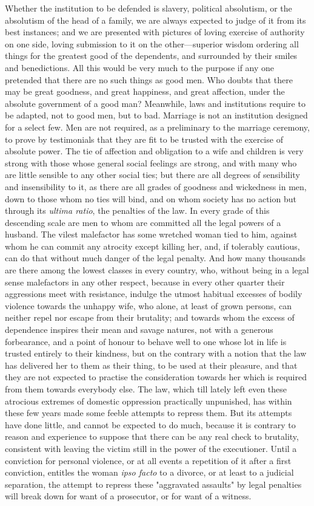 \documentclass[12pt]{report}
\begin{document}
Whether the institution to be defended is slavery, political absolutism, or the absolutism of the head of a family, we are always expected to judge of it from its best instances; and we are presented with pictures of loving exercise of authority on one side, loving submission to it on the other—superior wisdom ordering all things for the greatest good of the dependents, and surrounded by their smiles and benedictions. All this would be very much to the purpose if any one pretended that there are no such things as good men. Who doubts that there may be great goodness, and great happiness, and great affection, under the absolute government of a good man? Meanwhile, laws and institutions require to be adapted, not to good men, but to bad. Marriage is not an institution designed for a select few. Men are not required, as a preliminary to the marriage ceremony, to prove by testimonials that they are fit to be trusted with the exercise of absolute power. The tie of affection and obligation to a wife and children is very strong with those whose general social feelings are strong, and with many who are little sensible to any other social ties; but there are all degrees of sensibility and insensibility to it, as there are all grades of goodness and wickedness in men, down to those whom no ties will bind, and on whom society has no action but through its \emph{ultima ratio}, the penalties of the law. In every grade of this descending scale are men to whom are committed all the legal powers of a husband. The vilest malefactor has some wretched woman tied to him, against whom he can commit any atrocity except killing her, and, if tolerably cautious, can do that without much danger of the legal penalty. And how many thousands are there among the lowest classes in every country, who, without being in a legal sense malefactors in any other respect, because in every other quarter their aggressions meet with resistance, indulge the utmost habitual excesses of bodily violence towards the unhappy wife, who alone, at least of grown persons, can neither repel nor escape from their brutality; and towards whom the excess of dependence inspires their mean and savage natures, not with a generous forbearance, and a point of honour to behave well to one whose lot in life is trusted entirely to their kindness, but on the contrary with a notion that the law has delivered her to them as their thing, to be used at their pleasure, and that they are not expected to practise the consideration towards her which is required from them towards everybody else. The law, which till lately left even these atrocious extremes of domestic oppression practically unpunished, has within these few years made some feeble attempts to repress them. But its attempts have done little, and cannot be expected to do much, because it is contrary to reason and experience to suppose that there can be any real check to brutality, consistent with leaving the victim still in the power of the executioner. Until a conviction for personal violence, or at all events a repetition of it after a first conviction, entitles the woman \emph{ipso facto} to a divorce, or at least to a judicial separation, the attempt to repress these "aggravated assaults" by legal penalties will break down for want of a prosecutor, or for want of a witness.
\end{document}
